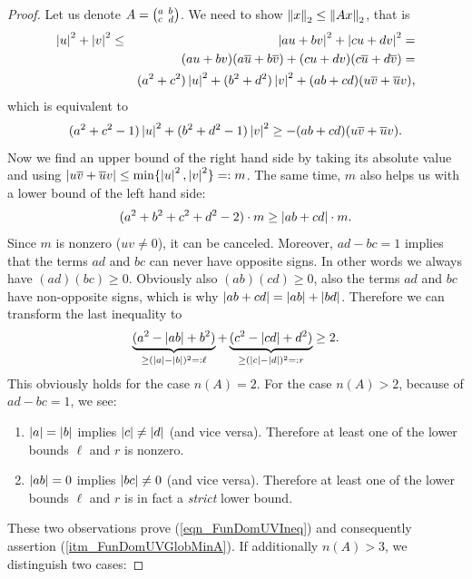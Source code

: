 \begin{proof}
Let us denote $A = \smallmat{a}{b}{c}{d}$. We need to show $\eucnorm{x} \le \eucnorm{Ax}$, that is
\begin{eqnarray*}
\abs{u}^2 + \abs{v}^2 
&\le& \abs{au + bv}^2 + \abs{cu + dv}^2 =\\
&& (au + bv)(a\conj{u} + b\conj{v}) + (cu + dv)(c\conj{u} + d\conj{v}) =\\
&& (a^2 + c^2)\abs{u}^2 + (b^2 + d^2)\abs{v}^2 + (ab + cd)(u\conj{v} + \conj{u}v),
\end{eqnarray*}
which is equivalent to
\begin{equation*}
(a^2 + c^2 - 1)\abs{u}^2 + (b^2 + d^2 - 1)\abs{v}^2 \ge -(ab + cd)(u\conj{v} + \conj{u}v).
\end{equation*}
Now we find an upper bound of the right hand side by taking its absolute value and using $\abs{u\conj{v} + \conj{u}v} \le \min\{\abs{u}^2, \abs{v}^2\} =: m$. The same time, $m$ also helps us with a lower bound of the left hand side:
\begin{equation*}
(a^2 + b^2 + c^2 + d^2 - 2) \cdot m \ge \abs{ab + cd} \cdot m.
\end{equation*}
Since $m$ is nonzero ($uv \ne 0$), it can be canceled. Moreover, $ad - bc = 1$ implies that the terms $ad$ and $bc$ can never have opposite signs. In other words we always have $(ad)(bc) \ge 0$. Obviously also $(ab)(cd) \ge 0$, \ie also the terms $ad$ and $bc$ have non-opposite signs, which is why $\abs{ab + cd} = \abs{ab} + \abs{bd}$. Therefore we can transform the last inequality to
\begin{equation}
\label{eqn_FunDomUVIneq}
\underbrace{(a^2 - \abs{ab} + b^2)}_{\ge(\abs{a}-\abs{b})^2 =: \ell} + 
\underbrace{(c^2 - \abs{cd} + d^2)}_{\ge(\abs{c}-\abs{d})^2 =: r} \ge 2.
\end{equation}
This obviously holds for the case $n(A) = 2$. For the case $n(A) > 2$, because of $ad - bc = 1$, we see:
\begin{enumerate}[\quad(a)]
\item 
\label{itm_FunDomUVObsA}
$\abs{a} = \abs{b}$ implies $\abs{c} \ne \abs{d}$ (and vice versa). Therefore at least one of the lower bounds $\ell$ and $r$ is nonzero.
\item 
\label{itm_FunDomUVObsB}
$\abs{ab} = 0$ implies $\abs{bc} \ne 0$ (and vice versa). Therefore at least one of the lower bounds $\ell$ and $r$ is in fact a \emph{strict} lower bound.
\end{enumerate}
These two observations prove (\ref{eqn_FunDomUVIneq}) and consequently assertion (\ref{itm_FunDomUVGlobMinA}). If additionally $n(A) > 3$, we distinguish two cases:

\end{proof}
